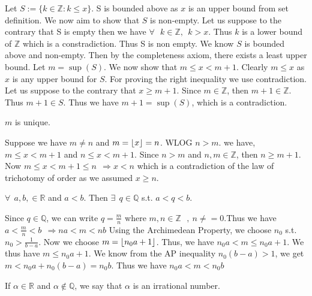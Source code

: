 \documentclass{scrartcl}
\begin{document}
    \begin{proof*}
        Let $S:=\{k \in \mathbb{Z} : k \leq x\}$. 
        S is bounded above as $x$ is an upper bound from set definition. We now aim to show that $S$ is non-empty.
        Let us suppose to the contrary that S is empty then we have 
        $\forall ~~~ k\in \mathbb{Z}, ~~ k>x$.  
        Thus $k$ is a lower bound of $\mathbb{Z}$ which is a constradiction. Thus S is non empty.
        We know $S$ is bounded above and non-empty. Then by the completeness axiom, there exists a least upper bound.
        Let $m = \sup(S)$. We now show that $m\leq x < m+1$. Clearly $m \leq x$ as $x$ is any upper bound for $S$. For proving the right inequality we use contradiction. 
        Let us suppose to the contrary that $x\geq m+1$. Since $m\in \mathbb{Z}$, then $m+1\in \mathbb{Z}$. Thus $m+1\in S$. Thus we have $m+1 = \sup(S)$, which is a contradiction.
    \end{proof*}
    \begin{claim*}
        $m$ is unique. 
        \begin{proof*}
            Suppose we have $m \neq n$ and $m = \left\lfloor x \right\rfloor=n$.
            WLOG $n>m$. 
            we have,$m \leq x < m+1 $ and $n\leq x < m+1$.
            Since $n>m$ and $n,m \in \mathbb{Z}$, then $n \geq m+1$.  
            Now $m \leq x <m+1 \leq n ~~\Rightarrow x<n$   
            which is a contradiction of the law of trichotomy of order as we assumed $x\geq n$. 
        \end{proof*}
    \end{claim*}
    \begin{theorem}
        $\forall ~~ a,b,\in \mathbb{R}$ and $a<b$. Then $\exists ~~q\in \mathbb{Q}$ s.t. $a<q<b$.
    \end{theorem}
    \begin{proof*}
        Since $q \in \mathbb{Q}$, we can write $q = \frac{m}{n}$ where $m,n\in\mathbb{Z}~~~,~n\neq=0$.Thus we have $a<\frac{m}{n}<b~~ \Rightarrow na<m<nb$
        Using the Archimedean Property, we choose $n_0$ s.t. $n_0 > \frac{1}{b-a}$. Now we choose $m = \left\lfloor n_0a+1 \right\rfloor$. Thus, we have $n_0a<m\leq n_0a+1$. We thus have
        $m\leq n_0a+1 $. We know from the AP inequality $n_0(b-a)>1$, we get $m < n_0a+n_0(b-a) =n_0b $. Thus we have $n_0a<m<n_0b$
    \end{proof*}
    \begin{definition}
        If $\alpha \in \mathbb{R}$ and $\alpha \notin \mathbb{Q}$, we say that $\alpha$ is an irrational number.
    \end{definition}
\end{document}
